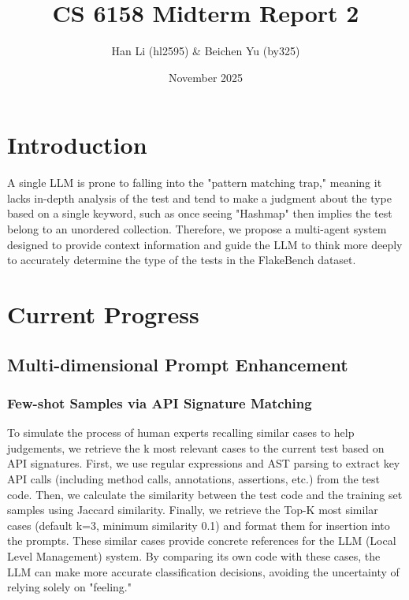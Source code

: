 \documentclass{article}
\title{CS 6158 Midterm Report 2}
\author{Han Li (hl2595) & Beichen Yu (by325)}
\date{November 2025}
\begin{document}
\maketitle


    


\section{Introduction}
A single LLM is prone to falling into the "pattern matching trap," meaning it lacks in-depth analysis of the test and tend to make a judgment about the type based on a single keyword, such as once seeing "Hashmap" then implies the test belong to an unordered collection. Therefore, we propose a multi-agent system designed to provide context information and guide the LLM to think more deeply to accurately determine the type of the tests in the FlakeBench dataset. 

\section{Current Progress}
\subsection{Multi-dimensional Prompt Enhancement}
\subsubsection{Few-shot Samples via API Signature Matching}
To simulate the process of human experts recalling similar cases to help judgements, we retrieve the k most relevant cases to the current test based on API signatures. First, we use regular expressions and AST parsing to extract key API calls (including method calls, annotations, assertions, etc.) from the test code. Then, we calculate the similarity between the test code and the training set samples using Jaccard similarity. Finally, we retrieve the Top-K most similar cases (default k=3, minimum similarity 0.1) and format them for insertion into the prompts. These similar cases provide concrete references for the LLM (Local Level Management) system. By comparing its own code with these cases, the LLM can make more accurate classification decisions, avoiding the uncertainty of relying solely on "feeling."
\end{document}
